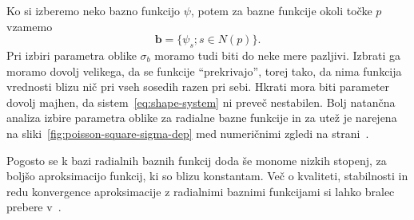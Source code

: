 \documentclass[a4paper,twoside]{article}
\theoremstyle{definition} %
\theoremstyle{plain} %
\numberwithin{equation}{section}
\renewcommand{\b}{\boldsymbol}
\begin{document}
Ko si izberemo neko bazno funkcijo $\psi$, potem za bazne funkcije okoli točke
$p$ vzamemo
\[
  \b b = \{\psi_s; s \in N(p) \}.
\]
Pri izbiri parametra oblike $\sigma_b$ moramo tudi biti do neke mere pazljivi. Izbrati
ga moramo dovolj velikega, da se funkcije ``prekrivajo'', torej tako, da nima
funkcija vrednosti blizu nič pri vseh sosedih razen pri sebi. Hkrati mora biti
parameter dovolj majhen, da sistem~\eqref{eq:shape-system} ni preveč nestabilen.
Bolj natančna analiza izbire parametra oblike za radialne bazne funkcije in
za utež je narejena na sliki~\ref{fig:poisson-square-sigma-dep} med numeričnimi
zgledi na strani~\pageref{fig:poisson-square-sigma-dep}.

Pogosto se k bazi radialnih baznih funkcij doda še monome nizkih stopenj, za
boljšo aproksimacijo funkcij, ki so blizu konstantam. Več o kvaliteti,
stabilnosti in redu konvergence aproksimacije z radialnimi baznimi funkcijami
si lahko bralec prebere v~\cite{buhmann2000radial}.
\end{document}
